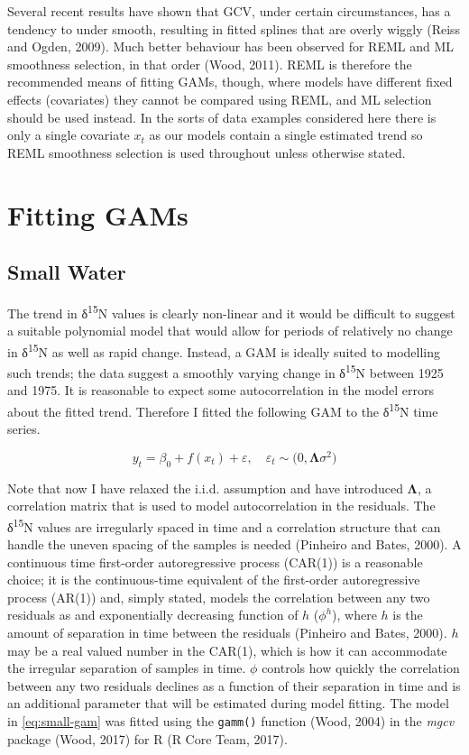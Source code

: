 \documentclass[12pt,]{article}
\begin{document}
Several recent results have shown that GCV, under certain circumstances,
has a tendency to under smooth, resulting in fitted splines that are
overly wiggly (Reiss and Ogden, 2009). Much better behaviour has been
observed for REML and ML smoothness selection, in that order (Wood,
2011). REML is therefore the recommended means of fitting GAMs, though,
where models have different fixed effects (covariates) they cannot be
compared using REML, and ML selection should be used instead. In the
sorts of data examples considered here there is only a single covariate
\(x_t\) as our models contain a single estimated trend so REML
smoothness selection is used throughout unless otherwise stated.

\section{Fitting GAMs}\label{fitting-gams}

\subsection{Small Water}\label{small-water}

The trend in δ\textsuperscript{15}N values is clearly non-linear and it
would be difficult to suggest a suitable polynomial model that would
allow for periods of relatively no change in δ\textsuperscript{15}N as
well as rapid change. Instead, a GAM is ideally suited to modelling such
trends; the data suggest a smoothly varying change in
δ\textsuperscript{15}N between 1925 and 1975. It is reasonable to expect
some autocorrelation in the model errors about the fitted trend.
Therefore I fitted the following GAM to the δ\textsuperscript{15}N time
series.

\begin{equation} \label{eq:small-gam}
y_t = \beta_0 + f(x_t) + \varepsilon, \quad \varepsilon_t \sim \mathcal(0, \boldsymbol{\Lambda}\sigma^2)
\end{equation}

Note that now I have relaxed the i.i.d. assumption and have introduced
\(\boldsymbol{\Lambda}\), a correlation matrix that is used to model
autocorrelation in the residuals. The δ\textsuperscript{15}N values are
irregularly spaced in time and a correlation structure that can handle
the uneven spacing of the samples is needed (Pinheiro and Bates, 2000).
A continuous time first-order autoregressive process (CAR(1)) is a
reasonable choice; it is the continuous-time equivalent of the
first-order autoregressive process (AR(1)) and, simply stated, models
the correlation between any two residuals as and exponentially
decreasing function of \(h\) (\(\phi^h\)), where \(h\) is the amount of
separation in time between the residuals (Pinheiro and Bates, 2000).
\(h\) may be a real valued number in the CAR(1), which is how it can
accommodate the irregular separation of samples in time. \(\phi\)
controls how quickly the correlation between any two residuals declines
as a function of their separation in time and is an additional parameter
that will be estimated during model fitting. The model in
\eqref{eq:small-gam} was fitted using the \texttt{gamm()} function
(Wood, 2004) in the \emph{mgcv} package (Wood, 2017) for R (R Core Team,
2017).
\end{document}
